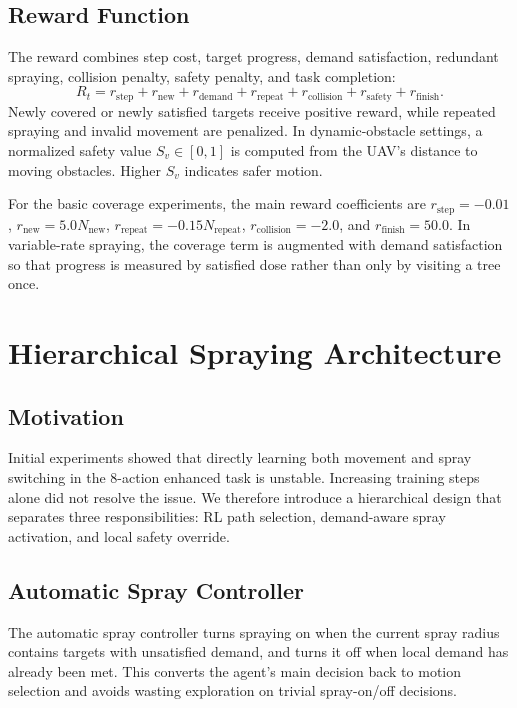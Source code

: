 \documentclass[conference,10pt]{IEEEtran}
\begin{document}
\subsection{Reward Function}
The reward combines step cost, target progress, demand satisfaction, redundant spraying, collision penalty, safety penalty, and task completion:
\begin{equation}
R_t = r_{\mathrm{step}} + r_{\mathrm{new}} + r_{\mathrm{demand}} + r_{\mathrm{repeat}} + r_{\mathrm{collision}} + r_{\mathrm{safety}} + r_{\mathrm{finish}}.
\end{equation}
Newly covered or newly satisfied targets receive positive reward, while repeated spraying and invalid movement are penalized. In dynamic-obstacle settings, a normalized safety value $S_v\in[0,1]$ is computed from the UAV's distance to moving obstacles. Higher $S_v$ indicates safer motion.

For the basic coverage experiments, the main reward coefficients are $r_{\mathrm{step}}=-0.01$, $r_{\mathrm{new}}=5.0N_{\mathrm{new}}$, $r_{\mathrm{repeat}}=-0.15N_{\mathrm{repeat}}$, $r_{\mathrm{collision}}=-2.0$, and $r_{\mathrm{finish}}=50.0$. In variable-rate spraying, the coverage term is augmented with demand satisfaction so that progress is measured by satisfied dose rather than only by visiting a tree once.

\section{Hierarchical Spraying Architecture}
\subsection{Motivation}
Initial experiments showed that directly learning both movement and spray switching in the 8-action enhanced task is unstable. Increasing training steps alone did not resolve the issue. We therefore introduce a hierarchical design that separates three responsibilities: RL path selection, demand-aware spray activation, and local safety override.

\subsection{Automatic Spray Controller}
The automatic spray controller turns spraying on when the current spray radius contains targets with unsatisfied demand, and turns it off when local demand has already been met. This converts the agent's main decision back to motion selection and avoids wasting exploration on trivial spray-on/off decisions.
\end{document}
